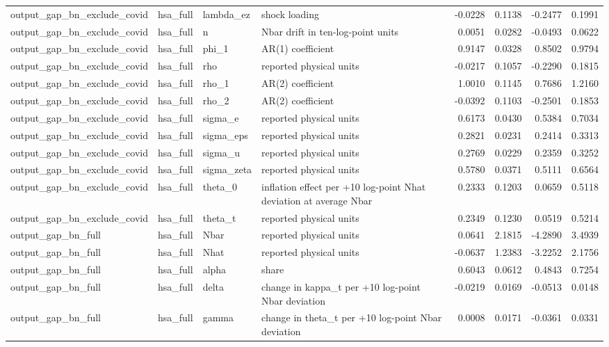 \begin{tabular}{llllrrrr}
output\_gap\_bn\_exclude\_covid & hsa\_full & lambda\_ez & shock loading & -0.0228 & 0.1138 & -0.2477 & 0.1991 \\
output\_gap\_bn\_exclude\_covid & hsa\_full & n & Nbar drift in ten-log-point units & 0.0051 & 0.0282 & -0.0493 & 0.0622 \\
output\_gap\_bn\_exclude\_covid & hsa\_full & phi\_1 & AR(1) coefficient & 0.9147 & 0.0328 & 0.8502 & 0.9794 \\
output\_gap\_bn\_exclude\_covid & hsa\_full & rho & reported physical units & -0.0217 & 0.1057 & -0.2290 & 0.1815 \\
output\_gap\_bn\_exclude\_covid & hsa\_full & rho\_1 & AR(2) coefficient & 1.0010 & 0.1145 & 0.7686 & 1.2160 \\
output\_gap\_bn\_exclude\_covid & hsa\_full & rho\_2 & AR(2) coefficient & -0.0392 & 0.1103 & -0.2501 & 0.1853 \\
output\_gap\_bn\_exclude\_covid & hsa\_full & sigma\_e & reported physical units & 0.6173 & 0.0430 & 0.5384 & 0.7034 \\
output\_gap\_bn\_exclude\_covid & hsa\_full & sigma\_eps & reported physical units & 0.2821 & 0.0231 & 0.2414 & 0.3313 \\
output\_gap\_bn\_exclude\_covid & hsa\_full & sigma\_u & reported physical units & 0.2769 & 0.0229 & 0.2359 & 0.3252 \\
output\_gap\_bn\_exclude\_covid & hsa\_full & sigma\_zeta & reported physical units & 0.5780 & 0.0371 & 0.5111 & 0.6564 \\
output\_gap\_bn\_exclude\_covid & hsa\_full & theta\_0 & inflation effect per +10 log-point Nhat deviation at average Nbar & 0.2333 & 0.1203 & 0.0659 & 0.5118 \\
output\_gap\_bn\_exclude\_covid & hsa\_full & theta\_t & reported physical units & 0.2349 & 0.1230 & 0.0519 & 0.5214 \\
output\_gap\_bn\_full & hsa\_full & Nbar & reported physical units & 0.0641 & 2.1815 & -4.2890 & 3.4939 \\
output\_gap\_bn\_full & hsa\_full & Nhat & reported physical units & -0.0637 & 1.2383 & -3.2252 & 2.1756 \\
output\_gap\_bn\_full & hsa\_full & alpha & share & 0.6043 & 0.0612 & 0.4843 & 0.7254 \\
output\_gap\_bn\_full & hsa\_full & delta & change in kappa\_t per +10 log-point Nbar deviation & -0.0219 & 0.0169 & -0.0513 & 0.0148 \\
output\_gap\_bn\_full & hsa\_full & gamma & change in theta\_t per +10 log-point Nbar deviation & 0.0008 & 0.0171 & -0.0361 & 0.0331 \\

\end{tabular}
